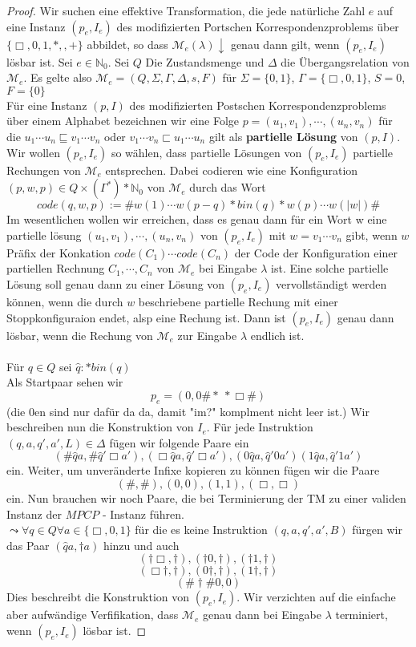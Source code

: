  \begin{proof}
    Wir suchen eine effektive Transformation, die jede natürliche Zahl $e$ auf eine Instanz $(p_e,I_e)$ des modifizierten Portschen Korrespondenzproblems über $\{\Box, 0, 1, *, , +\}$ abbildet, so dass $\mathcal{M} _e(\lambda)\downarrow$ genau dann gilt, wenn $(p_e, I_e)$ lösbar ist. Sei $e \in \mathbb{N}_0$. Sei $Q$ Die Zustandsmenge und $\Delta$ die Übergangsrelation von $\mathcal{M}_e$. Es gelte also $\mathcal{M}_e = (Q, \Sigma, \Gamma, \Delta, s, F)$ für $\Sigma = \{0, 1\}$, $\Gamma = \{\Box, 0, 1\}$, $S = 0$, $F = \{0\}$ \\ Für eine Instanz $(p, I)$ des modifizierten Postschen Korrespondenzproblems über einem Alphabet bezeichnen wir eine Folge $p =  (u_1, v_1), \cdots, (u_n, v_n)$ für die $u_1 \cdots u_n \sqsubseteq v_1 \cdots v_n$ oder $v_1 \cdots v_n \sqsubset u_1 \cdots u_n$ gilt als \textbf{partielle Lösung} von $(p, I)$. Wir wollen $(p_e, I_e)$ so wählen, dass partielle Lösungen von $(p_e, I_e)$ partielle Rechungen von $\mathcal{M}_e$ entsprechen. Dabei codieren wie eine Konfiguration $(p, w, p) \in Q \times(\Gamma^*)*\mathbb{N}_0$ von $\mathcal{M}_e$ durch das Wort \[code (q, w, p) := \# w(1)\cdots w(p-q) * bin(q)* w(p) \cdots w(|w|)\#\] Im wesentlichen wollen wir erreichen, dass es genau dann für ein Wort w eine partielle lösung  $(u_1, v_1), \cdots, (u_n, v_n)$ von $(p_e, I_e)$ mit $w = v_1 \cdots v_n$ gibt, wenn $w$ Präfix der Konkation $code (C_1) \cdots code (C_n)$ der Code der Konfiguration einer partiellen Rechnung $C_1, \cdots, C_n$ von $\mathcal{M}_e$ bei Eingabe $\lambda$ ist. Eine solche partielle Lösung soll genau dann zu einer Lösung von $(p_e, I_e)$ vervollständigt werden können, wenn die durch $w$ beschriebene partielle Rechung mit einer Stoppkonfiguraion endet, alsp eine Rechung ist. Dann ist $(p_e, I_e)$ genau dann lösbar, wenn die Rechung von $\mathcal{M}_e$ zur Eingabe $\lambda$ endlich ist. \\\\ Für $q \in Q$ sei $\hat{q} : * bin(q)$\\ Als Startpaar sehen wir \[p_e = (0, 0 \# * \ *\Box\#)\] (die 0en sind nur dafür da da, damit "im?" komplment nicht leer ist.) Wir beschreiben nun die Konstruktion von $I_e$. Für jede Instruktion $(q, a, q', a', L) \in \Delta$ fügen wir folgende Paare ein \[(\# \hat{q}a, \# \hat{q}'\Box a'), (\Box \hat{q} a, \hat{q}'\Box a'), (0\hat{q}a, \hat{q}'0a')(1\hat{q}a, \hat{q}'1a')\] ein. Weiter, um unveränderte Infixe kopieren zu können fügen wir die Paare \[(\#, \#), (0, 0), (1,1), (\Box, \Box)\] ein. Nun brauchen wir noch Paare, die bei Terminierung der TM zu einer validen Instanz der $MPCP$ - Instanz führen.\\ $\leadsto \forall q \in Q \forall a \in \{\Box, 0, 1\}$ für die es keine Instruktion $(q, a, q', a', B)$ fürgen wir das Paar $(\hat{q}a, \dagger a)$ hinzu und auch \[(\dagger \Box, \dagger), (\dagger 0, \dagger), (\dagger 1, \dagger)\] \[(\Box \dagger, \dagger),(0 \dagger, \dagger),(1\dagger, \dagger)\] \[(\# \dagger \# 0, 0)\] Dies beschreibt die Konstruktion von $(p_e, I_e)$. Wir verzichten auf die einfache aber aufwändige Verfifikation, dass $\mathcal{M}_e$ genau dann bei Eingabe $\lambda$ terminiert, wenn $(p_e, I_e)$ lösbar ist.
  \end{proof}
